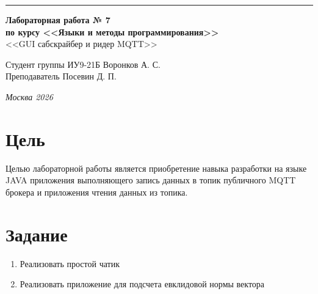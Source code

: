 \documentclass[a4paper, 14pt]{extarticle}
\begin{document}
\begin{titlepage}
\vspace*{-16pt}
\hspace{30pt}\rule{0.866\textwidth}{0.4pt}
  
\vspace{11em}

\begin{center}
\Large {\bf Лабораторная работа № 7} \\ 
\large {\bf по курсу <<Языки и методы программирования>>} \\ 
\large <<GUI сабскрайбер и ридер MQTT>>
\end{center}\normalsize

\vspace{8em}


\begin{flushright}
  {Студент группы ИУ9-21Б Воронков А. С.\hspace*{15pt} \\
  \vspace{2ex}
  Преподаватель Посевин Д. П.\hspace*{15pt}}
\end{flushright}

\bigskip

\vfill
 

\begin{center}
\textsl{Москва 2026}
\end{center}
\end{titlepage}

\renewcommand{\ttdefault}{pcr}

\setlength{\tabcolsep}{3pt}
\newpage
\setcounter{page}{2}

\section{Цель}\label{Sect::task}
\par 
Целью лабораторной работы является приобретение навыка разработки на языке 
JAVA приложения выполняющего запись данных в топик публичного MQTT брокера и 
приложения чтения данных из топика. 
\section{Задание}
\begin{enumerate}
    \item Реализовать простой чатик
    \item Реализовать приложение для подсчета евклидовой нормы вектора
\end{enumerate}
\pagebreak
\end{document}
